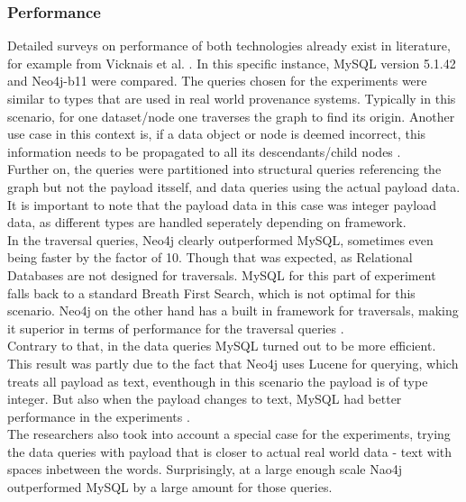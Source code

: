 \subsubsection{Performance}
Detailed surveys on performance of both technologies already exist in literature, for example from Vicknais et al. \autocite{Vicknair2010}. In this specific instance, MySQL version 5.1.42 and Neo4j-b11 were compared.
The queries chosen for the experiments were similar to types that are used in real world provenance systems. Typically in this scenario, for one dataset/node one traverses the graph to find its origin. Another use case in this context is, if a data object or node is deemed incorrect, this information needs to be propagated to all its descendants/child nodes \autocite{Vicknair2010}.\\
Further on, the queries were partitioned into structural queries referencing the graph but not the payload itsself, and data queries using the actual payload data. It is important to note that the payload data in this case was integer payload data, as different types are handled seperately depending on framework.\\
In the traversal queries, Neo4j clearly outperformed MySQL, sometimes even being faster by the factor of 10. Though that was expected, as Relational Databases are not designed for traversals. MySQL for this part of experiment falls back to a standard Breath First Search, which is not optimal for this scenario. Neo4j on the other hand has a built in framework for traversals, making it superior in terms of performance for the traversal queries \autocite{Vicknair2010}. \\
Contrary to that, in the data queries MySQL turned out to be more efficient. This result was partly due to the fact that Neo4j uses Lucene for querying, which treats all payload as text, eventhough in this scenario the payload is of type integer. But also when the payload changes to text, MySQL had better performance in the experiments \autocite{Vicknair2010}. \\
The researchers also took into account a special case for the experiments, trying the data queries with payload that is closer to actual real world data - text with spaces inbetween the words. Surprisingly, at a large enough scale Nao4j outperformed MySQL by a large amount for those queries.

